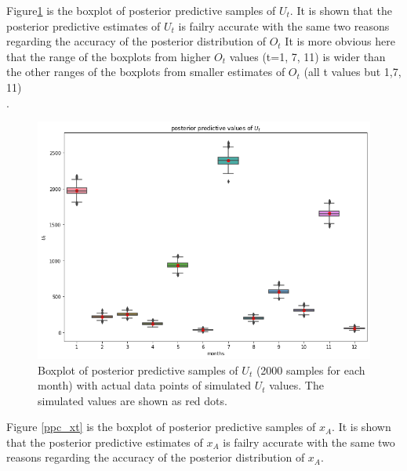 \documentclass[
10pt, %
a4paper, %
oneside, %
headinclude,footinclude, %
BCOR5mm, %
]{scrartcl}
\begin{document}
Figure\ref{ppc_ut} is the boxplot of posterior predictive samples of $U_t$. It is shown that the posterior predictive estimates of $U_t$ is failry accurate with the same two reasons regarding the accuracy of the posterior distribution of $O_t$ It is more obvious here that the range of the boxplots from  higher $O_t$ values (t=1, 7, 11) is wider than the other ranges of the boxplots from smaller estimates of $O_t$ (all t values but 1,7, 11)\\.

\begin{figure}[htb]
	\centering
	\includegraphics[width=1\linewidth]{Figures/early_r_ppc1_ut.png}
	\caption{Boxplot of posterior predictive samples of $U_t$ (2000 samples for each month) with actual data points of simulated $U_t$ values. The simulated values are shown as red dots.}
	\label{ppc_ut}
\end{figure}

Figure \ref{ppc_xt} is the boxplot of posterior predictive samples of $x_A$. It is shown that the posterior predictive estimates of $x_A$ is failry accurate with the same two reasons regarding the accuracy of the posterior distribution of $x_A$.\\
 
\end{document}
